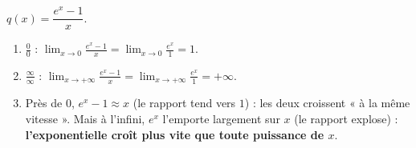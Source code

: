 \documentclass[11pt,a4paper]{article}
\begin{document}
\begin{correction}
$q(x)=\dfrac{e^x-1}{x}$.
\begin{enumerate}[label=\alph*),leftmargin=2em,itemsep=3pt]
  \item $\frac00$ : $\displaystyle\lim_{x\to 0}\frac{e^x-1}{x}=\lim_{x\to 0}\frac{e^x}{1}=1$.
  \item $\frac{\infty}{\infty}$ : $\displaystyle\lim_{x\to+\infty}\frac{e^x-1}{x}=\lim_{x\to+\infty}\frac{e^x}{1}=+\infty$.
  \item Près de $0$, $e^x-1\approx x$ (le rapport tend vers $1$) : les deux croissent « à la même vitesse ».
        Mais à l'infini, $e^x$ l'emporte largement sur $x$ (le rapport explose) : \textbf{l'exponentielle croît
        plus vite que toute puissance de $x$}.
\end{enumerate}
\end{correction}
\end{document}
